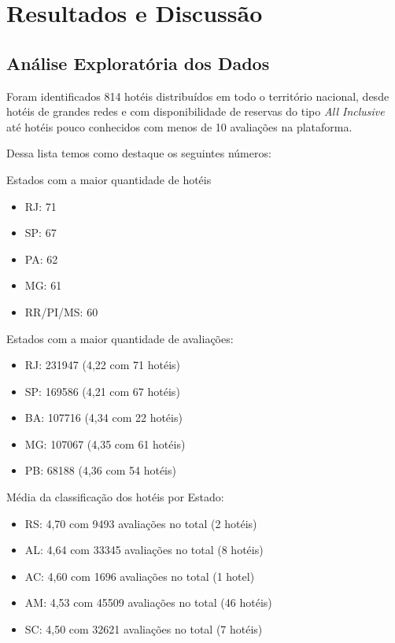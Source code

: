 \chapter{Resultados e Discussão}
\label{cap:resultados}

\section{Análise Exploratória dos Dados}
\label{cap:resultados:sec:analise_exploratoria}

Foram identificados 814 hotéis distribuídos em todo o território nacional, desde hotéis de grandes redes e com disponibilidade de reservas do tipo \textit{All Inclusive} até hotéis pouco conhecidos com menos de 10 avaliações na plataforma.

Dessa lista temos como destaque os seguintes números:

Estados com a maior quantidade de hotéis
\begin{itemize}
	\item RJ: 71
	\item SP: 67
	\item PA: 62
	\item MG: 61
	\item RR/PI/MS: 60
\end{itemize}

Estados com a maior quantidade de avaliações:

\begin{itemize}
	\item RJ: 231947 (4,22 com 71 hotéis)
	\item SP: 169586 (4,21 com 67 hotéis)
	\item BA: 107716 (4,34 com 22 hotéis)
	\item MG: 107067 (4,35 com 61 hotéis)
	\item PB: 68188 (4,36 com 54 hotéis)
\end{itemize}

Média da classificação dos hotéis por Estado:

\begin{itemize}
	\item RS: 4,70 com 9493 avaliações no total (2 hotéis)
	\item AL: 4,64 com 33345 avaliações no total (8 hotéis)
	\item AC: 4,60 com 1696 avaliações no total (1 hotel)
	\item AM: 4,53 com 45509 avaliações no total (46 hotéis)
	\item SC: 4,50 com 32621 avaliações no total (7 hotéis)
\end{itemize}

